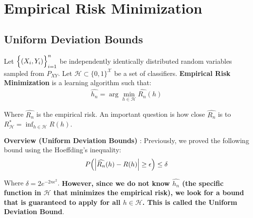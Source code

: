 \newpage\section{Empirical Risk Minimization}

\subsection{Uniform Deviation Bounds}
\begin{definition}
    Let $\Big\{ (X_i, Y_i) \Big\}_{i=1}^n$ be independently identically distributed random variables sampled from $P_{XY}$. Let $\mathcal{H}\subset \{0,1\}^{\mathcal{X}}$ be a set of classifiers. \textbf{Empirical Risk Minimization} is a learning algorithm such that:
    \begin{align*}
        \widehat{h_n} = \arg\min_{h\in\mathcal{H}} \widehat{R_n}(h)
    \end{align*}

    \noindent Where $\widehat{R_n}$ is the empirical risk. An important question is how close $\widehat{R_n}$ is to $R^*_\mathcal{H}=\inf_{h\in\mathcal{H}} R(h)$.
\end{definition}

\textbf{Overview (Uniform Deviation Bounds)} : Previously, we proved the following bound using the Hoeffding's inequality:
\begin{align*}
    P\Big( 
        \Big| 
            \widehat{R_n}(h) - R(h)
         \Big| \ge \epsilon
     \Big) \le \delta
\end{align*}

\noindent Where $\delta = 2e^{-2n\epsilon^2}$. \textbf{However, since we do not know $\widehat{h_n}$ (the specific function in $\mathcal{H}$ that minimizes the empirical risk), we look for a bound that is guaranteed to apply for all $h\in\mathcal{H}$. This is called the Uniform Deviation Bound}.

